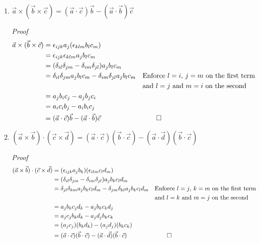 \documentclass[11pt,twoside]{article}
\newcommand{\vect}[1]{\vec{#1}}
\newcommand{\cross}{\times}
\begin{document}
\begin{enumerate}
%
%
\item $\vect{a}\cross(\vect{b}\cross\vect{c}) = (\vect{a}\cdot\vect{c})\vect{b} - (\vect{a}\cdot\vect{b})\vect{c}$

\textit{Proof}
\begin{align*}
\vect{a}\cross(\vect{b}\cross\vect{c}) & = \epsilon_{ijk}a_j(\epsilon_{klm}b_lc_m)\\
                                       & = \epsilon_{ijk}\epsilon_{klm}a_jb_lc_m\\
                                       & = (\delta_{il}\delta_{jm}-\delta_{im}\delta_{jl})a_jb_lc_m\\
                                       & = \delta_{il}\delta_{jm}a_jb_lc_m-\delta_{im}\delta_{jl}a_jb_lc_m 
                                         && \text{Enforce $l=i$, $j=m$ on the first term}\\
                                       & && \text{and $l=j$ and $m=i$ on the second}\\
                                       & = a_jb_ic_j-a_jb_jc_i \\
                                       & = a_ic_ib_j-a_ib_ic_j \\
                                       & = (\vect{a}\cdot\vect{c})\vect{b} - (\vect{a}\cdot\vect{b})\vect{c} && \qed
\end{align*}



%
%
\item $(\vect{a}\cross\vect{b})\cdot(\vect{c}\cross\vect{d}) = (\vect{a}\cdot\vect{c})(\vect{b}\cdot{\vect{c}})-(\vect{a}\cdot\vect{d})(\vect{b}\cdot{\vect{c}})$

\textit{Proof} 
\begin{align*}
(\vect{a}\cross\vect{b})\cdot(\vect{c}\cross\vect{d}) 
            & = (\epsilon_{ijk}a_jb_k)(\epsilon_{ilm}c_ld_m)\\
            & = (\delta_{il}\delta_{jm}-\delta_{im}\delta_{jl})a_jb_kc_ld_m\\  
            & = \delta_{jl}\delta_{km}a_jb_kc_ld_m-\delta_{jm}\delta_{kl}a_jb_kc_ld_m
              && \text{Enforce $l=j$, $k=m$ on the first term}\\
            & && \text{and $l=k$ and $m=j$ on the second}\\
            & = a_jb_kc_jd_k-a_jb_kc_kd_j\\
            & = a_jc_jb_kd_k-a_jd_jb_kc_k\\
            & = (a_jc_j)(b_kd_k)-(a_jd_j)(b_kc_k)\\
            & = (\vect{a}\cdot\vect{c})(\vect{b}\cdot{\vect{c}})-(\vect{a}\cdot\vect{d})(\vect{b}\cdot{\vect{c}}) && \qed
\end{align*}



\end{enumerate}
\end{document}
